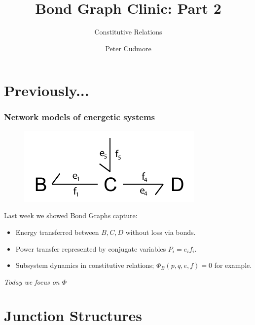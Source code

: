 \documentclass[11pt,reqno]{beamer}
\title{Bond Graph Clinic: Part 2}
\subtitle{Constitutive Relations}
\author{Peter Cudmore}
\institute{Systems Biology Lab, The University of Melbourne}
\begin{document}
	\begin{frame}
	\titlepage
	\addtocounter{framenumber}{-1} 
\end{frame}
\begin{frame}
\tableofcontents[hideallsubsections]
\end{frame}
\section{Previously...}
\begin{frame}
\frametitle{Network models of energetic systems}
	\begin{figure}
	\includegraphics{images/bondgraph.pdf}
\end{figure}
Last week we showed Bond Graphs capture:
\begin{itemize}
	\item Energy transferred between $B,C,D$ without loss via bonds.
	\item Power transfer represented by conjugate variables $P_i=e_if_i$.
	\item Subsystem dynamics in constitutive relations; $\Phi_B(p,q,e,f) = 0$ for example.
\end{itemize}
\pause
\emph{Today we focus on $\Phi$}
\end{frame}
\section{Junction Structures}
\end{document}
